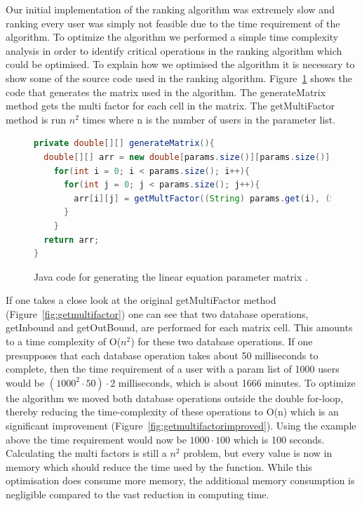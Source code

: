 Our initial implementation of the ranking algorithm was extremely slow and ranking every user was simply not feasible due to the time requirement of the algorithm. To optimize the algorithm we performed a  simple time complexity analysis in order to identify critical operations in the ranking algorithm which could be optimised. To explain how we optimised the algorithm it is necessary to show some of the source code used in the ranking algorithm. Figure~\ref{fig:generateMatrix} shows the code that generates the matrix used in the algorithm. The generateMatrix method gets the multi factor for each cell in the matrix. The getMultiFactor method is run \(n^2\) times where n is the number of users in the parameter list.

\begin{figure}[h!]
\begin{lstlisting}[language=java]
private double[][] generateMatrix(){ 
  double[][] arr = new double[params.size()][params.size()]; 
    for(int i = 0; i < params.size(); i++){ 
      for(int j = 0; j < params.size(); j++){ 
        arr[i][j] = getMultFactor((String) params.get(i), (String) params.get(j));
      }
    } 
  return arr;
}
\end{lstlisting}
\caption{Java code for generating the linear equation parameter matrix \protect \cite{Goodrarzi2009}.}
\label{fig:generateMatrix}
\end{figure}

If one takes a close look at the original getMultiFactor method (Figure~\ref{fig:getmultifactor}) one can see that two database operations, getInbound and getOutBound, are performed for each matrix cell. This amounts to a time complexity of O(\( n^2\)) for these two database operations. If one presupposes that each database operation takes about 50 milliseconds to complete, then the time requirement of a user with a param list of 1000 users would be  \((1000^2 \cdot 50) \cdot 2\) milliseconds, which is about 1666 minutes. To optimize the algorithm we moved both database operations outside the double for-loop, thereby reducing the time-complexity of these operations to O(n) which is an significant improvement (Figure~\ref{fig:getmultifactorimproved}). Using the example above the time requirement would now be \(1000 \cdot 100\) which is 100 seconds. Calculating the multi factors is still a \(n^2\) problem, but every value is now in memory which should reduce the time used by the function. While this optimisation does consume more memory, the additional memory consumption is negligible compared to the vast reduction in computing time.

